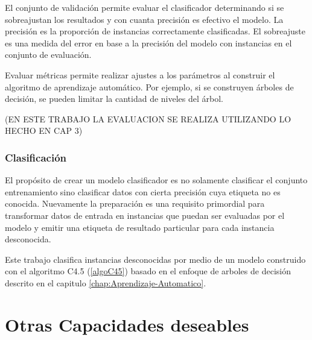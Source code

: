El conjunto de validación permite evaluar el clasificador determinando
si se sobreajustan los resultados y con cuanta precisión es efectivo
el modelo. La precisión es la proporción de instancias correctamente
clasificadas. El sobreajuste es una medida del error en base a la
precisión del modelo con instancias en el conjunto de evaluación.

Evaluar métricas permite realizar ajustes a los parámetros al construir
el algoritmo de aprendizaje automático. Por ejemplo, si se construyen
árboles de decisión, se pueden limitar la cantidad de niveles del
árbol.

(EN ESTE TRABAJO LA EVALUACION SE REALIZA UTILIZANDO LO HECHO EN CAP
3)

\subsubsection{Clasificación}

El propósito de crear un modelo clasificador es no solamente clasificar
el conjunto entrenamiento sino clasificar datos con cierta precisión
cuya etiqueta no es conocida. Nuevamente la preparación es una requisito
primordial para transformar datos de entrada en instancias que puedan
ser evaluadas por el modelo y emitir una etiqueta de resultado particular
para cada instancia desconocida.

Este trabajo clasifica instancias desconocidas por medio de un modelo
construido con el algoritmo C4.5 (\ref{algoC45}) basado en el enfoque
de arboles de decisión descrito en el capitulo \ref{chap:Aprendizaje-Automatico}.

\section{Otras Capacidades deseables}

